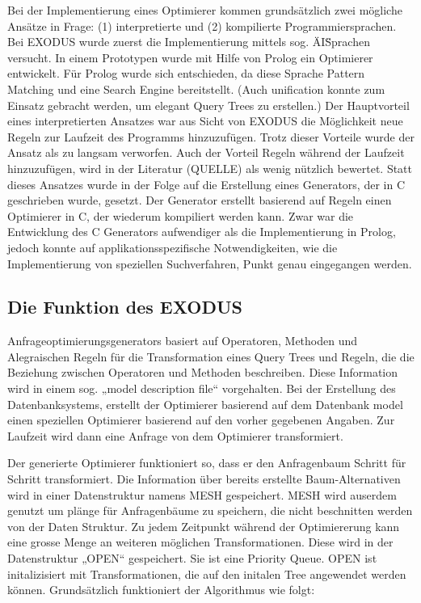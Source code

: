 Bei der Implementierung eines Optimierer kommen grundsätzlich zwei mögliche Ansätze in Frage: (1) interpretierte und (2) kompilierte Programmiersprachen. Bei EXODUS wurde zuerst die Implementierung mittels sog. \"AI\" Sprachen versucht. In einem Prototypen wurde mit Hilfe von Prolog ein Optimierer entwickelt. Für Prolog wurde sich entschieden, da diese Sprache Pattern Matching und eine Search Engine bereitstellt. (Auch unification konnte zum Einsatz gebracht werden, um elegant Query Trees zu erstellen.) Der Hauptvorteil eines interpretierten Ansatzes war aus Sicht von EXODUS die Möglichkeit neue Regeln zur Laufzeit des Programms hinzuzufügen. Trotz dieser Vorteile wurde der Ansatz als zu langsam verworfen. Auch der Vorteil Regeln während der Laufzeit hinzuzufügen, wird in der Literatur (QUELLE) als wenig nützlich bewertet. Statt dieses Ansatzes wurde in der Folge auf die Erstellung eines Generators, der in C geschrieben wurde, gesetzt. Der Generator erstellt basierend auf Regeln einen Optimierer in C, der wiederum kompiliert werden kann. Zwar war die Entwicklung des C Generators aufwendiger als die Implementierung in Prolog, jedoch konnte auf applikationsspezifische Notwendigkeiten, wie die Implementierung von speziellen Suchverfahren, Punkt genau eingegangen werden.

\subsection{Die Funktion des EXODUS} Anfrageoptimierungsgenerators basiert auf Operatoren, Methoden und Alegraischen Regeln für die Transformation eines Query Trees und Regeln, die die Beziehung zwischen Operatoren und Methoden beschreiben. Diese Information wird in einem sog. „model description file“ vorgehalten. Bei der Erstellung des Datenbanksystems, erstellt der Optimierer basierend auf dem Datenbank model einen speziellen Optimierer basierend auf den vorher gegebenen Angaben. Zur Laufzeit wird dann eine Anfrage von dem Optimierer transformiert.

Der generierte Optimierer funktioniert so, dass er den Anfragenbaum Schritt für Schritt transformiert. Die Information über bereits erstellte Baum-Alternativen wird in einer Datenstruktur namens MESH gespeichert. MESH wird auserdem genutzt um plänge für Anfragenbäume zu speichern, die nicht beschnitten werden von der Daten Struktur. Zu jedem Zeitpunkt während der Optimiererung kann eine grosse Menge an weiteren möglichen Transformationen. Diese wird in der Datenstruktur „OPEN“ gespeichert. Sie ist eine Priority Queue. OPEN ist initalizisiert mit Transformationen, die auf den initalen Tree angewendet werden können. Grundsätzlich funktioniert der Algorithmus wie folgt:

